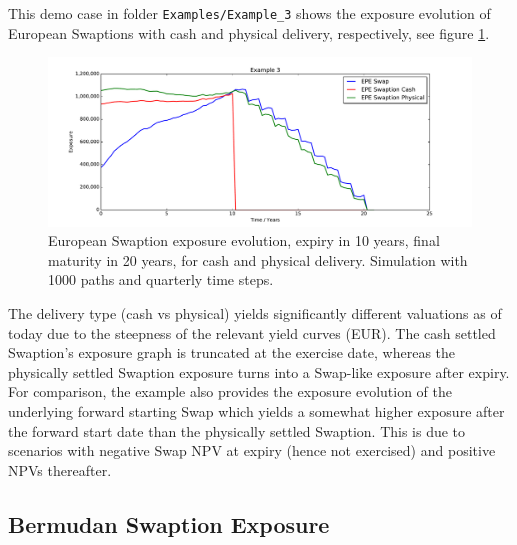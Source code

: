 \documentclass[12pt, a4paper]{article}
\begin{document}
This demo case in folder {\tt Examples/Example\_3} shows the exposure evolution of European Swaptions with cash and
physical delivery, respectively, see figure \ref{fig_3}.
\begin{figure}[h!]
\begin{center}
\includegraphics[scale=0.45]{mpl_swaption.pdf}
\end{center}
\caption{European Swaption exposure evolution, expiry in 10 years, final maturity in 20 years, for cash and physical
  delivery. Simulation with 1000 paths and quarterly time steps.}
\label{fig_3}
\end{figure}
The delivery type (cash vs physical) yields significantly different valuations as of today due to the steepness of the
relevant yield curves (EUR). The cash settled Swaption's exposure graph is truncated at the exercise date, whereas the
physically settled Swaption exposure turns into a Swap-like exposure after expiry. For comparison, the example also
provides the exposure evolution of the underlying forward starting Swap which yields a somewhat higher exposure after
the forward start date than the physically settled Swaption. This is due to scenarios with negative Swap NPV at expiry
(hence not exercised) and positive NPVs thereafter.

\subsection{Bermudan Swaption Exposure}
\end{document}
